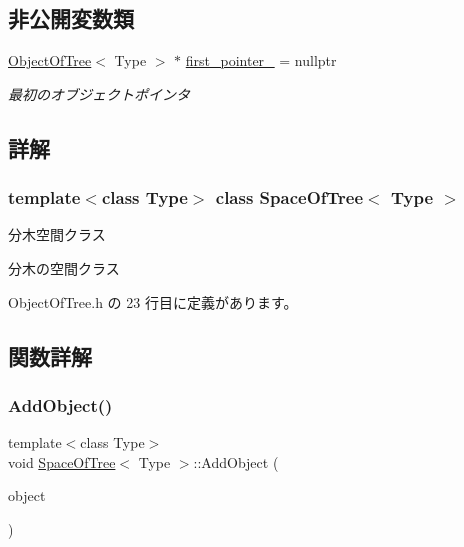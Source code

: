 \subsection*{非公開変数類}
\begin{DoxyCompactItemize}
\item 
\mbox{\hyperlink{class_object_of_tree}{Object\+Of\+Tree}}$<$ Type $>$ $\ast$ \mbox{\hyperlink{class_space_of_tree_afc9920e9fc6499dfe6fada154e69fa0f}{first\+\_\+pointer\+\_\+}} = nullptr
\begin{DoxyCompactList}\small\item\em 最初のオブジェクトポインタ \end{DoxyCompactList}\end{DoxyCompactItemize}


\subsection{詳解}
\subsubsection*{template$<$class Type$>$\newline
class Space\+Of\+Tree$<$ Type $>$}

分木空間クラス 

分木の空間クラス 

 Object\+Of\+Tree.\+h の 23 行目に定義があります。



\subsection{関数詳解}
\mbox{\label{class_space_of_tree_a8156722056d7b2ab354ff22235772d7e}} 
\subsubsection{\texorpdfstring{Add\+Object()}{AddObject()}}
{\footnotesize\ttfamily template$<$class Type$>$ \\
void \mbox{\hyperlink{class_space_of_tree}{Space\+Of\+Tree}}$<$ Type $>$\+::Add\+Object (\begin{DoxyParamCaption}\item[{\mbox{\hyperlink{class_object_of_tree}{Object\+Of\+Tree}}$<$ Type $>$ $\ast$}]{object }\end{DoxyParamCaption})\hspace{0.3cm}{\ttfamily [inline]}}



